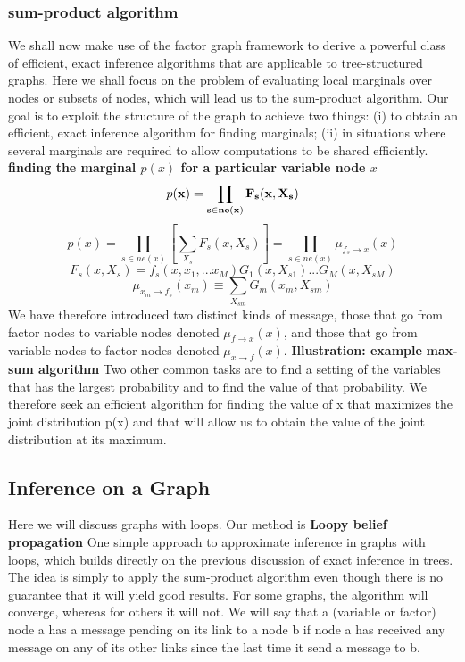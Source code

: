 \documentclass{article}
\begin{document}
\subsubsection*{sum-product algorithm}
We shall now make use of the factor graph framework to derive a powerful class
of efficient, exact inference algorithms that are applicable to tree-structured graphs.
Here we shall focus on the problem of evaluating local marginals over nodes or
subsets of nodes, which will lead us to the sum-product algorithm.\newline
Our goal is to exploit the structure of
the graph to achieve two things: (i) to obtain an efficient, exact inference algorithm
for finding marginals; (ii) in situations where several marginals are required to allow
computations to be shared efficiently.
\textbf{finding the marginal $p(x)$ for a particular variable node $x$}\newline
$$p(\bf x) = \prod_{s\in ne(x)}F_s(x,X_s)   $$
$$p(x) = \prod_{s\in ne(x)}[\sum_{X_s}F_s(x,X_s)] = \prod_{s\in ne(x)}\mu_{f_s\rightarrow x}(x) $$
$$F_s(x,X_s) =  f_s(x,x_1,...x_M)G_1(x,X_{s1})...G_M(x,X_{sM})$$
$$\mu_{x_m\rightarrow f_s}(x_m) \equiv \sum_{X_{sm}}G_m(x_m,X_{sm})$$
We have therefore introduced two distinct kinds of message, those that go from factor
nodes to variable nodes denoted $\mu_{f\rightarrow x}(x)$, and those that go from variable nodes to
factor nodes denoted $\mu_{x\rightarrow f}(x).$
\textbf{Illustration: example}
\textbf{max-sum algorithm}
Two other common tasks are to find a setting of the variables that has the largest probability
and to find the value of that probability. We therefore seek an efficient algorithm for finding the value of x that maximizes
the joint distribution p(x) and that will allow us to obtain the value of the
joint distribution at its maximum.
\subsection{Inference on a Graph}
Here we will discuss graphs with loops. Our method is \textbf{Loopy belief propagation}
One simple approach to approximate inference in graphs with
loops, which builds directly on the previous discussion of exact inference in trees.
The idea is simply to apply the sum-product algorithm even though there is no guarantee
that it will yield good results. For some graphs, the algorithm will converge, whereas for others it will not. \newline
We will say that a (variable or factor) node a has a message pending on its link to a node b if node a has received any
message on any of its other links since the last time it send a message to b.
\end{document}
